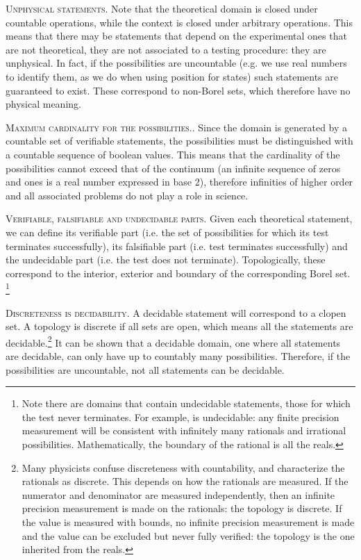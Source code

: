 \documentclass[10pt,twocolumn, nofootinbib]{revtex4-1}
\newcommand\partitle[1]{\textsc{#1}.}
\begin{document}
\partitle{Unphysical statements} Note that the theoretical domain is closed under countable operations, while the context is closed under arbitrary operations. This means that there may be statements that depend on the experimental ones that are not theoretical, they are not associated to a testing procedure: they are unphysical. In fact, if the possibilities are uncountable (e.g. we use real numbers to identify them, as we do when using position for states) such statements are guaranteed to exist. These correspond to non-Borel sets, which therefore have no physical meaning.

\partitle{Maximum cardinality for the possibilities.} Since the domain is generated by a countable set of verifiable statements, the possibilities must be distinguished with a countable sequence of boolean values. This means that the cardinality of the possibilities cannot exceed that of the continuum (an infinite sequence of zeros and ones is a real number expressed in base 2), therefore infinities of higher order and all associated problems do not play a role in science.

\partitle{Verifiable, falsifiable and undecidable parts} Given each theoretical statement, we can define its verifiable part (i.e. the set of possibilities for which its test terminates successfully), its falsifiable part (i.e. test terminates successfully) and the undecidable part (i.e. the test does not terminate). Topologically, these correspond to the interior, exterior and boundary of the corresponding Borel set. \footnote{Note there are domains that contain undecidable statements, those for which the test never terminates. For example,  is undecidable: any finite precision measurement will be consistent with infinitely many rationals and irrational possibilities. Mathematically, the boundary of the rational is all the reals.}

\partitle{Discreteness is decidability} A decidable statement will correspond to a clopen set. A topology is discrete if all sets are open, which means all the statements are decidable.\footnote{Many physicists confuse discreteness with countability, and characterize the rationals as discrete. This depends on how the rationals are measured. If the numerator and denominator are measured independently, then an infinite precision measurement is made on the rationals: the topology is discrete. If the value is measured with bounds, no infinite precision measurement is made and the value can be excluded but never fully verified: the topology is the one inherited from the reals.} It can be shown that a decidable domain, one where all statements are decidable, can only have up to countably many possibilities. Therefore, if the possibilities are uncountable, not all statements can be decidable.
\end{document}
